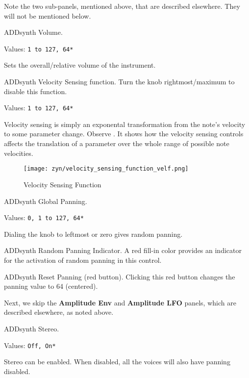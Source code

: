    Note the two sub-panels, mentioned above, that are described elsewhere.
   They will not be mentioned below.

   \setcounter{ItemCounter}{0}      %

   ADDsynth Volume.

   Values: \texttt{1 to 127, 64*}

   Sets the overall/relative volume of the instrument.

   ADDsynth Velocity Sensing function.
   Turn the knob rightmost/maximum to disable this function.

   Values: \texttt{1 to 127, 64*}

   Velocity sensing is simply an exponental transformation from the note’s
   velocity to some parameter change.
   Observe .
   It shows how the velocity sensing controls affects the translation of a
   parameter over the whole range of possible note velocities.

\begin{figure}[H]
   \centering 
   \texttt{[image: zyn/velocity\_sensing\_function\_velf.png]}
   \caption{Velocity Sensing Function}
   \label{fig:velocity_sensing_function}
\end{figure}

   ADDsynth Global Panning.

   Values: \texttt{0, 1 to 127, 64*}

   Dialing the knob to leftmost or zero gives random panning.

   ADDsynth Random Panning Indicator.
   A red fill-in color provides an indicator for the activation of random
   panning in this control.

   ADDsynth Reset Panning (red button).
   Clicking this red button changes the panning value to 64 (centered).

   Next, we skip the \textbf{Amplitude Env} and \textbf{Amplitude LFO}
   panels, which are described elsewhere, as noted above.

   ADDsynth Stereo.

   Values: \texttt{Off, On*}

   Stereo can be enabled.
   When disabled, all the voices will also have panning disabled.

